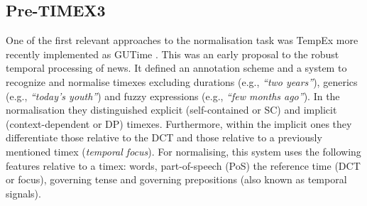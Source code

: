 \documentclass[10pt, a4paper]{article}
\begin{document}

\subsection{Pre-TIMEX3}

One of the first relevant approaches to the normalisation task was TempEx \cite{Mani2000} more recently implemented as GUTime \cite{Verhagen2005TARSQI}. This was an early proposal to the robust temporal processing of news. It defined an annotation scheme and a system to recognize and normalise timexes excluding durations (e.g., \emph{``two years''}), generics (e.g., \emph{``today's youth''}) and fuzzy expressions (e.g., \emph{``few months ago''}). In the normalisation they distinguished explicit (self-contained or SC) and implicit (context-dependent or DP) timexes.
Furthermore, within the implicit ones they differentiate those relative to the DCT and those relative to a previously mentioned timex (\textit{temporal focus}). For normalising, this system uses the following features relative to a timex: words, part-of-speech (PoS) the reference time (DCT or focus), governing tense and governing prepositions (also known as temporal signals).


\end{document}
